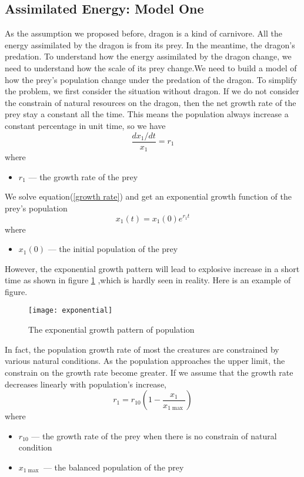 \documentclass{mcmthesis}
\begin{document}
\subsection{Assimilated Energy: Model One}
As the assumption we proposed before, dragon is a kind of carnivore. All the energy assimilated by the dragon is from its prey. In the meantime, the dragon's predation. To understand how the energy assimilated by the dragon change, we need to understand how the scale of its prey change.We need to build a model of how the prey's population change under the predation of the dragon.
To simplify the problem, we first consider the situation without dragon. If we do not consider the constrain of natural resources on the dragon, then the net growth rate of the prey stay a constant all the time. This means the population always increase a constant percentage in unit time, so we have
\begin{equation}
\label{growth rate}
\frac{dx_1/dt}{x_1}=r_1
\end{equation}
where \begin{itemize}
\item $r_1$ --- the growth rate of the prey
\end{itemize}
We solve equation(\ref{growth rate}) and get an exponential growth function of the prey's population
\begin{equation}
x_1(t)=x_1(0)e^{r_1t}
\end{equation}
where \begin{itemize}
\item $x_1(0)$ --- the initial population of the prey
\end{itemize}
However, the exponential growth pattern will lead to explosive increase in a short time as shown in figure \ref{exponential growth plot} ,which is hardly seen in reality.
Here is an example of figure.
\begin{figure}[h]
\small
\centering
\texttt{[image: exponential]}
\caption{The exponential growth pattern of population}\label{exponential growth plot}
\end{figure}
In fact, the population growth rate of most the creatures are constrained by various natural conditions. As the population approaches the upper limit, the constrain on the growth rate become greater. If we assume that the growth rate decreases linearly with population's increase,
\begin{equation}
r_1=r_{10}(1-\frac{x_1}{x_{1\max}})
\end{equation}
where \begin{itemize}
\item $r_{10}$ --- the growth rate of the prey when there is no constrain of natural condition
\item $x_{1\max}$ --- the balanced population of the prey
\end{itemize}
\end{document}
